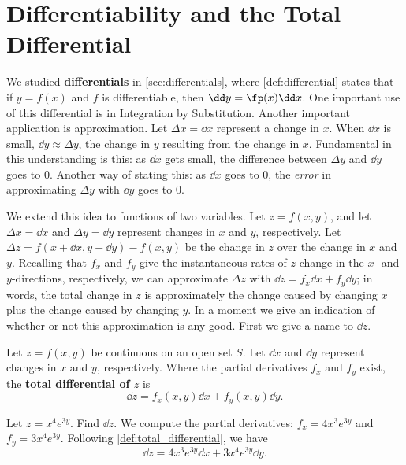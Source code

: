 \section{Differentiability and the Total Differential}\label{sec:total_differential}

We studied \textbf{differentials} in \autoref{sec:differentials}, where \autoref{def:differential}  states that if $y=f(x)$ and $f$ is differentiable, then $\dd y=\fp(x)\dd x$. One important use of this differential is in Integration by Substitution. Another important application is approximation. Let $\Delta x = \dd x$ represent a change in $x$. When $\dd x$ is small, $\dd y\approx \Delta y$, the change in $y$ resulting from the change in $x$. Fundamental in this understanding is this: as $\dd x$ gets small, the difference between $\Delta y$ and $\dd y$ goes to 0. Another way of stating this: as $\dd x$ goes to 0, the \emph{error} in approximating $\Delta y$ with $\dd y$ goes to 0.

We extend this idea to functions of two variables. Let $z=f(x,y)$, and let $\Delta x = \dd x$ and $\Delta y=\dd y$ represent changes in $x$ and $y$, respectively. Let $\Delta z = f(x+\dd x,y+\dd y) - f(x,y)$ be the change in $z$ over the change in $x$ and $y$. Recalling that $f_x$ and $f_y$ give the instantaneous rates of $z$-change in the $x$- and $y$-directions, respectively, we can approximate $\Delta z$ with $\dd z = f_x\dd x+f_y\dd y$; in words, the total change in $z$ is approximately the change caused by changing $x$ plus the change caused by changing $y$. In a moment we give an indication of whether or not this approximation is any good. First we give a name to $\dd z$.

\begin{definition}\label{def:total_differential}%
Let $z=f(x,y)$ be continuous on an open set $S$. Let $\dd x$ and $\dd y$ represent changes in $x$ and $y$, respectively. Where the partial derivatives $f_x$ and $f_y$ exist, the \textbf{total differential of $z$} is 
\[\dd z = f_x(x,y)\dd x + f_y(x,y)\dd y.\]
\end{definition}


\begin{example}\label{ex_total_diff_10}%
Let $z = x^4e^{3y}$. Find $\dd z$.
\solution
We compute the partial derivatives: $f_x = 4x^3e^{3y}$ and $f_y = 3x^4e^{3y}$. Following \autoref{def:total_differential}, we have
\[\dd z = 4x^3e^{3y}\dd x+3x^4e^{3y}\dd y.\]
\end{example}

